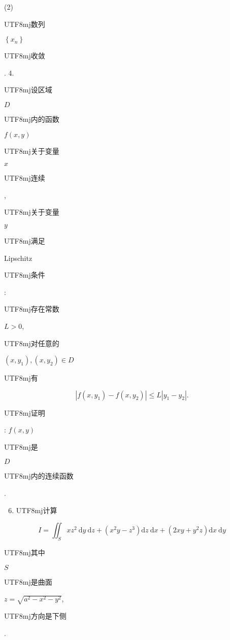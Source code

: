 \documentclass[10pt]{article}
\begin{document}
(2) \begin{CJK}{UTF8}{mj}数列\end{CJK} $\left\{x_{n}\right\}$ \begin{CJK}{UTF8}{mj}收敛\end{CJK}. 4. \begin{CJK}{UTF8}{mj}设区域\end{CJK} $D$ \begin{CJK}{UTF8}{mj}内的函数\end{CJK} $f(x, y)$ \begin{CJK}{UTF8}{mj}关于变量\end{CJK} $x$ \begin{CJK}{UTF8}{mj}连续\end{CJK}, \begin{CJK}{UTF8}{mj}关于变量\end{CJK} $y$ \begin{CJK}{UTF8}{mj}满足\end{CJK} Lipschitz \begin{CJK}{UTF8}{mj}条件\end{CJK}: \begin{CJK}{UTF8}{mj}存在常数\end{CJK} $L>0$, \begin{CJK}{UTF8}{mj}对任意的\end{CJK} $\left(x, y_{1}\right),\left(x, y_{2}\right) \in D$ \begin{CJK}{UTF8}{mj}有\end{CJK}
$$
\left|f\left(x, y_{1}\right)-f\left(x, y_{2}\right)\right| \leqslant L\left|y_{1}-y_{2}\right| .
$$
\begin{CJK}{UTF8}{mj}证明\end{CJK}: $f(x, y)$ \begin{CJK}{UTF8}{mj}是\end{CJK} $D$ \begin{CJK}{UTF8}{mj}内的连续函数\end{CJK}.

\begin{enumerate}
  \setcounter{enumi}{5}
  \item \begin{CJK}{UTF8}{mj}计算\end{CJK}
\end{enumerate}
$$
I=\iint_{S} x z^{2} \mathrm{~d} y \mathrm{~d} z+\left(x^{2} y-z^{3}\right) \mathrm{d} z \mathrm{~d} x+\left(2 x y+y^{2} z\right) \mathrm{d} x \mathrm{~d} y
$$
\begin{CJK}{UTF8}{mj}其中\end{CJK} $S$ \begin{CJK}{UTF8}{mj}是曲面\end{CJK} $z=\sqrt{a^{2}-x^{2}-y^{2}}$, \begin{CJK}{UTF8}{mj}方向是下侧\end{CJK}.
\end{document}
